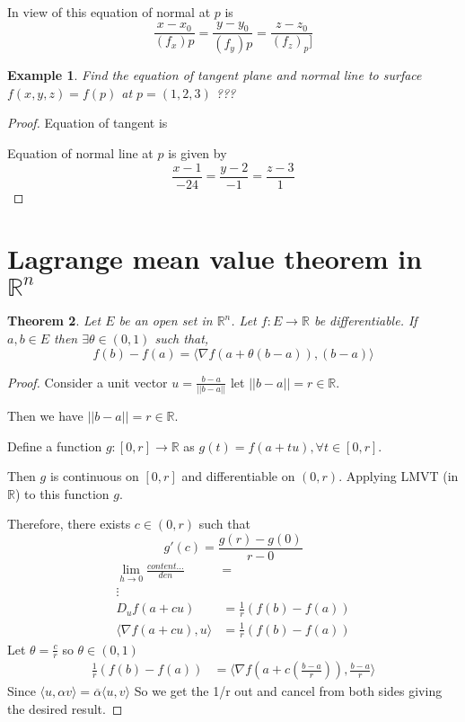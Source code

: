 \documentclass[oneside,11pt,pdftex]{book}%
\numberwithin{equation}{section}
\newtheorem{theorem}{Theorem}[chapter]%
\newtheorem{example}[theorem]{Example}
\numberwithin{section}{chapter}
\numberwithin{equation}{chapter}
\newcommand{\R}{\mathbb{R}}
\begin{document}
In view of this equation of normal at $ p $ is 
\[ \frac{x-x_0}{(f_x)p}=\frac{y-y_0}{(f_y)p}=\frac{z-z_0}{(f_z)_p]} \]

\begin{example}
	Find the equation of tangent plane and normal line to surface $ f(x,y,z)=f(p) $ at $ p=(1,2,3) $ ???
\end{example}
\begin{proof}
	Equation of tangent is
	
	Equation of normal line at $ p $ is given by
	\[ \frac{x-1}{-24}=\frac{y-2}{-1}=\frac{z-3}{1} \]
\end{proof}

\section{Lagrange mean value theorem in $ \R^n $}
\begin{theorem}
	Let $ E $ be an open set in $ \R^n $. Let $ f:E \rightarrow \R  $ be differentiable. If $ a,b \in E$ then $ \exists \theta \in (0,1) $ such that,\[ f(b)-f(a)=\langle \nabla f(a+\theta(b-a)), (b-a)\rangle\]
\end{theorem}
\begin{proof}
	Consider a unit vector $ u=\frac{b-a}{||b-a||} $ let $ ||b-a||=r\in \R $.
	
	Then we have $ ||b-a||=r \in \R $. 
	
	Define a function $ g:[0,r]\rightarrow \R  $ as $ g(t)=f(a+tu), \forall t \in [0,r] $.
	
	Then $ g  $ is continuous on $ [0,r] $ and differentiable on $ (0,r) $. Applying LMVT (in $ \R  $) to this function $ g $.
	
	Therefore, there exists $ c \in (0,r) $ such that \[ g'(c)=\frac{g(r)-g(0)}{r-0} \]
	\begin{align*}
		\lim_{h \rightarrow 0} \frac{content...}{den}&=\\
		\vdots\\
		D_uf(a+cu)&=\frac{1}{r}(f(b)-f(a))\\
		\langle \nabla f(a+cu),u \rangle &= \frac{1}{r}(f(b)-f(a))
	\end{align*}
	Let $ \theta=\frac{c}{r}$ so $ \theta \in (0,1) $
	\begin{align*}
		\frac{1}{r}(f(b)-f(a))&=\langle \nabla f\left(a+c\left(\frac{b-a}{r}\right)\right),\frac{b-a}{r}\rangle
	\end{align*}
	Since $ \langle u, \alpha v\rangle = \overline{\alpha}\langle u, v\rangle $
	So we get the 1/r out and cancel from both sides giving the desired result.
\end{proof}
\end{document}
